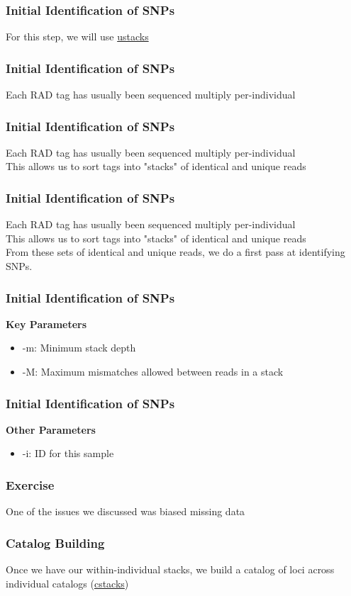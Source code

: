 \documentclass{beamer}
\begin{document}
\begin{frame}
\frametitle{Initial Identification of SNPs}
For this step, we will use \href{http://catchenlab.life.illinois.edu/stacks/comp/ustacks.php}{ustacks}
\end{frame}

\begin{frame}
\frametitle{Initial Identification of SNPs}
Each RAD tag has usually been sequenced multiply per-individual
\end{frame}

\begin{frame}
\frametitle{Initial Identification of SNPs}
Each RAD tag has usually been sequenced multiply per-individual \\
This allows us to sort tags into "stacks" of identical and unique reads
\end{frame}

\begin{frame}
\frametitle{Initial Identification of SNPs}
Each RAD tag has usually been sequenced multiply per-individual \\
This allows us to sort tags into "stacks" of identical and unique reads \\
From these sets of identical and unique reads, we do a first pass at identifying SNPs.
\end{frame}

\begin{frame}
\frametitle{Initial Identification of SNPs}
\textbf{Key Parameters}
\begin{itemize}
\item -m: Minimum stack depth
\item -M: Maximum mismatches allowed between reads in a stack
\end{itemize}
\end{frame}

\begin{frame}
\frametitle{Initial Identification of SNPs}
\textbf{Other Parameters}
\begin{itemize}
\item -i: ID for this sample
\end{itemize}
\end{frame}

\begin{frame}
\frametitle{Exercise}
One of the issues we discussed was biased missing data
\end{frame}

\begin{frame}
\frametitle{Catalog Building}
Once we have our within-individual stacks, we build a catalog of loci across individual catalogs (\href{http://catchenlab.life.illinois.edu/stacks/comp/cstacks.php}{cstacks})
\end{frame}
\end{document}
